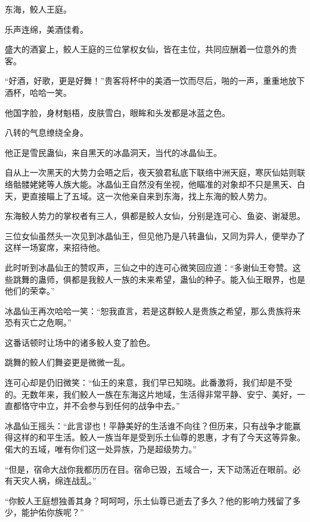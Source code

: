 
\begin{this_body}



东海，鲛人王庭。

乐声连绵，美酒佳肴。

盛大的酒宴上，鲛人王庭的三位掌权女仙，皆在主位，共同应酬着一位意外的贵客。

“好酒，好歌，更是好舞！”贵客将杯中的美酒一饮而尽后，啪的一声，重重地放下酒杯，哈哈一笑。

他国字脸，身材魁梧，皮肤雪白，眼眸和头发都是冰蓝之色。

八转的气息缭绕全身。

他正是雪民蛊仙，来自黑天的冰晶洞天，当代的冰晶仙王。

自从上一次黑天的大势力会晤之后，夜天狼君私底下联络中洲天庭，寒灰仙姑则联络骷髅姥姥等人族大能。冰晶仙王自然没有坐视，他瞄准的对象却不只是黑天、白天，更直接瞄上了五域。这一次他亲自来到东海，找上东海的鲛人势力。

东海鲛人势力的掌权者有三人，俱都是鲛人女仙，分别是连可心、鱼姿、谢凝思。

三位女仙虽然头一次见到冰晶仙王，但见他乃是八转蛊仙，又同为异人，便举办了这样一场宴席，来招待他。

此时听到冰晶仙王的赞叹声，三仙之中的连可心微笑回应道：“多谢仙王夸赞。这些跳舞的蛊师，俱都是我鲛人一族的未来希望，蛊仙的种子。能入仙王眼界，也是他们的荣幸。”

冰晶仙王再次哈哈一笑：“恕我直言，若是这群鲛人是贵族之希望，那么贵族将来恐有灭亡之危啊。”

这番话顿时让场中的诸多鲛人变了脸色。

跳舞的鲛人们舞姿更是微微一乱。

连可心却是仍旧微笑：“仙王的来意，我们早已知晓。此番激将，我们却是不受的。无数年来，我们鲛人一族在东海这片地域，生活得非常平静、安宁、美好，一直都恪守中立，并不会参与到任何的战争中去。”

冰晶仙王摇头：“此言谬也！平静美好的生活谁不向往？但历来，只有战争才能赢得这样的和平生活。鲛人一族当年是受到乐土仙尊的恩惠，才有了今天这等异象。偌大的五域，唯有你们这一处异族，乃是超级势力。”

“但是，宿命大战你我都历历在目。宿命已毁，五域合一，天下动荡近在眼前。必有天灾人祸，绵连战乱。”

“你鲛人王庭想独善其身？呵呵呵，乐土仙尊已逝去了多久？他的影响力残留了多少，能护佑你族呢？”


\end{this_body}

